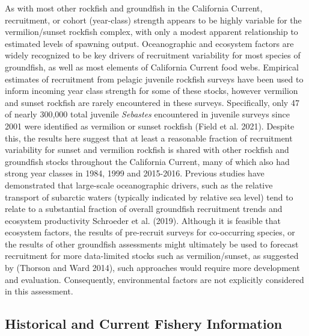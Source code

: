 \documentclass[
  english,
  a4paper,
]{article}
\begin{document}
As with most other rockfish and groundfish in the California Current, recruitment,
or cohort (year-class) strength appears to be highly variable for the vermilion/sunset
rockfish complex, with only a modest apparent relationship to estimated levels of spawning output. Oceanographic and ecosystem factors are widely recognized to be key drivers of
recruitment variability for most species of groundfish, as well as most elements
of California Current food webs. Empirical estimates of recruitment from pelagic
juvenile rockfish surveys have been used to inform incoming year class strength for
some of these stocks, however vermilion and sunset rockfish are rarely encountered
in these surveys. Specifically, only 47 of nearly 300,000 total juvenile \emph{Sebastes}
encountered in juvenile surveys since 2001 were identified as vermilion or sunset
rockfish (Field et al. 2021). Despite this, the results here suggest that at least a
reasonable fraction of recruitment variability for sunset and vermilion rockfish
is shared with other rockfish and groundfish stocks throughout the California Current,
many of which also had strong year classes in 1984, 1999 and 2015-2016. Previous studies
have demonstrated that large-scale oceanographic drivers, such as the relative transport
of subarctic waters (typically indicated by relative sea level) tend to relate to a
substantial fraction of overall groundfish recruitment trends and ecosystem
productivity Schroeder et al. (2019). Although it is feasible that
ecosystem factors, the results of pre-recruit surveys for co-occurring species,
or the results of other groundfish assessments might ultimately be used to
forecast recruitment for more data-limited stocks such as vermilion/sunset,
as suggested by (Thorson and Ward 2014), such approaches would require more
development and evaluation. Consequently, environmental factors are not
explicitly considered in this assessment.

\hypertarget{historical-and-current-fishery-information}{%
\subsection{Historical and Current Fishery Information}\label{historical-and-current-fishery-information}}
\end{document}
